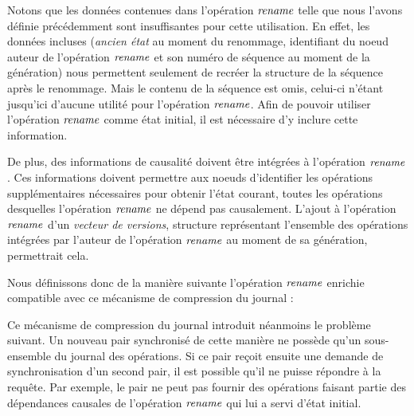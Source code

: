 Notons que les données contenues dans l'opération $\mathit{rename}$ telle que nous l'avons définie précédemment  sont insuffisantes pour cette utilisation.
En effet, les données incluses (\emph{ancien état} au moment du renommage, identifiant du noeud auteur de l'opération $\mathit{rename}$ et son numéro de séquence au moment de la génération) nous permettent seulement de recréer la structure de la séquence après le renommage.
Mais le contenu de la séquence est omis, celui-ci n'étant jusqu'ici d'aucune utilité pour l'opération $\mathit{rename}$.
Afin de pouvoir utiliser l'opération $\mathit{rename}$ comme état initial, il est nécessaire d'y inclure cette information.

De plus, des informations de causalité doivent être intégrées à l'opération $\mathit{rename}$.
Ces informations doivent permettre aux noeuds d'identifier les opérations supplémentaires nécessaires pour obtenir l'état courant, \ie toutes les opérations desquelles l'opération $\mathit{rename}$ ne dépend pas causalement.
L'ajout à l'opération $\mathit{rename}$ d'un \emph{vecteur de versions}, structure représentant l'ensemble des opérations intégrées par l'auteur de l'opération $\mathit{rename}$ au moment de sa génération, permettrait cela.

Nous définissons donc de la manière suivante l'opération $\mathit{rename}$ enrichie compatible avec ce mécanisme de compression du journal :

\indent{}
Ce mécanisme de compression du journal introduit néanmoins le problème suivant.
Un nouveau pair synchronisé de cette manière ne possède qu'un sous-ensemble du journal des opérations.
Si ce pair reçoit ensuite une demande de synchronisation d'un second pair, il est possible qu'il ne puisse répondre à la requête.
Par exemple, le pair ne peut pas fournir des opérations faisant partie des dépendances causales de l'opération $\mathit{rename}$ qui lui a servi d'état initial.

